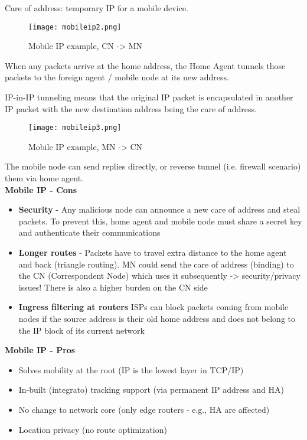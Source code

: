 Care of address: temporary IP for a mobile device.

\begin{figure}[H]
  \centering
  \texttt{[image: mobileip2.png]}
  \caption{Mobile IP example, CN -> MN}
  \label{fig:mobileip2}
\end{figure}

When any packets arrive at the home address, the Home Agent tunnels those
packets to the foreign agent / mobile node at its new address.

IP-in-IP tunneling means that the original IP packet is encapsulated in another
IP packet with the new destination address being the care of address.

\begin{figure}[H]
  \centering
  \texttt{[image: mobileip3.png]}
  \caption{Mobile IP example, MN -> CN}
  \label{fig:mobileip3}
\end{figure}

The mobile node can send replies directly, or reverse tunnel (i.e. firewall
scenario) them via home agent.\\

\textbf{Mobile IP - Cons}

\begin{itemize}
  \item \textbf{Security} - Any malicious node can announce a new care of
address and steal packets.
To prevent this, home agent and mobile node must share a secret key and
authenticate their communications
  \item \textbf{Longer routes} - Packets have to travel extra distance
to the home agent and back (triangle routing).
MN could send the care of address (binding) to the CN (Correspondent Node)
which uses it subsequently -> security/privacy issues!
There is also a higher burden on the CN side
  \item \textbf{Ingress filtering at routers}
ISPs can block packets coming from mobile nodes if the source address is their
old home address and does not belong to the IP block of its current network
\end{itemize}

\textbf{Mobile IP - Pros}

\begin{itemize}
  \item Solves mobility at the root (IP is the lowest layer in TCP/IP)
  \item In-built (integrato) tracking support (via permanent IP address and HA)
  \item No change to network core (only edge routers - e.g., HA are affected)
  \item Location privacy (no route optimization)
\end{itemize}

